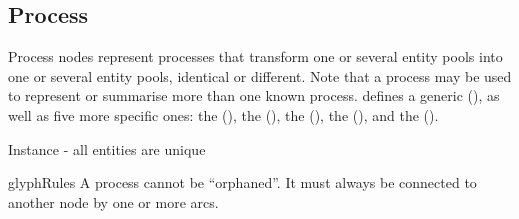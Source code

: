 






\subsection{Process}\label{sec:PNs}

Process nodes represent processes that transform one or several entity
pools into one or several entity pools, identical or different. Note
that a process may be used to represent or summarise more than one
known process.  \SBGNPDLone defines a generic 
(), as well as five more specific ones: the
 (), the  (), the 
(), the  (),
and the  ().

\begin{glyphDescription}
  \begin{glyphIdentity}
    \item Instance - all entities are unique
  \end{glyphIdentity}

  \item glyphRules A process cannot be ``orphaned''. It must always
    be connected to another node by one or more arcs.
\end{glyphDescription}


